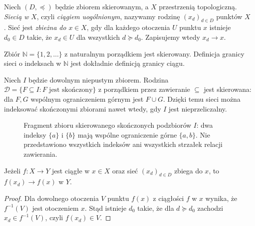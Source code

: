 \begin{definicja}
\label{def:topog-siec-granica}
Niech $(D,\preceq)$ będzie zbiorem skierowanym,
a $X$ przestrzenią topologiczną. \emph{Siecią w $X$}, czyli \emph{ciągiem uogólnionym},
nazywamy rodzinę $(x_d)_{d\in D}$ punktów $X$.
Sieć jest \emph{zbieżna do $x\in X$}, gdy dla każdego
otoczenia $U$ punktu $x$ istnieje $d_0\in D$ takie,
że $x_d\in U$ dla wszystkich $d\succeq d_0$.
Zapisujemy wtedy $x_d\to x$.
\end{definicja}

\begin{przyklad}
\label{ex:topog-ciag-jako-siec}
Zbiór $\mathbb N=\{1,2,\ldots\}$ z naturalnym porządkiem
jest skierowany. Definicja granicy sieci o indeksach
w $\mathbb N$ jest dokładnie definicją granicy ciągu.
\end{przyklad}

\begin{przyklad}
\label{ex:topog-siec-skonczone}
Niech $I$ będzie dowolnym niepustym zbiorem.
Rodzina $\mathcal D=\{F\subseteq I:F\text{ jest skończony}\}$
z porządkiem przez zawieranie $\subseteq$ jest skierowana:
dla $F,G$ wspólnym ograniczeniem górnym jest $F\cup G$.
Dzięki temu sieci można indeksować skończonymi
zbiorami nawet wtedy, gdy $I$ jest nieprzeliczalny.
\end{przyklad}

\begin{figure}[htbp]
\centering
{}
\caption{Fragment zbioru skierowanego skończonych podzbiorów
$I$: dwa indeksy $\{a\}$ i $\{b\}$ mają wspólne ograniczenie
górne $\{a,b\}$. Nie przedstawiono wszystkich indeksów
ani wszystkich strzałek relacji zawierania.}
\label{fig:topog-skierowanie}
\end{figure}

\begin{stwierdzenie}
\label{prop:topog-siec-ciaglosc-jeden-kierunek}
Jeżeli $f\colon X\to Y$ jest ciągłe w $x\in X$
oraz sieć $(x_d)_{d\in D}$ zbiega do $x$, to
$f(x_d)\to f(x)$ w $Y$.
\end{stwierdzenie}
\begin{proof}
Dla dowolnego otoczenia $V$ punktu $f(x)$
z ciągłości $f$ w $x$ wynika, że $f^{-1}(V)$ jest
otoczeniem $x$. Stąd istnieje $d_0$ takie, że
dla $d\succeq d_0$ zachodzi
$x_d\in f^{-1}(V)$, czyli $f(x_d)\in V$.
\end{proof}

